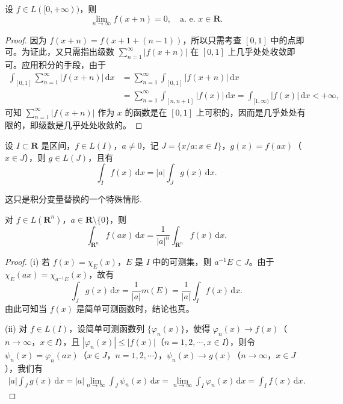 \documentclass[../../main.tex]{subfiles}
\begin{document}
\begin{example}
设 $f \in L([0, +\infty))$，则
\[
\lim_{n \to \infty} f(x + n) = 0, \quad \text{a. e. } x \in \mathbf{R}.
\]
\end{example}
\begin{proof}
因为 $f(x + n) = f(x + 1 + (n - 1))$，所以只需考查 $[0, 1]$ 中的点即可。为证此，又只需指出级数 $\sum_{n=1}^{\infty} |f(x + n)|$ 在 $[0, 1]$ 上几乎处处收敛即可。应用积分的手段，由于
\begin{align*}
\int_{[0, 1]} \sum_{n=1}^{\infty} |f(x + n)| \, \mathrm{d}x &= \sum_{n=1}^{\infty} \int_{[0, 1]} |f(x + n)| \, \mathrm{d}x \\
&= \sum_{n=1}^{\infty} \int_{[n, n + 1]} |f(x)| \, \mathrm{d}x = \int_{[1, \infty)} |f(x)| \, \mathrm{d}x < +\infty,
\end{align*}
可知 $\sum_{n=1}^{\infty} |f(x + n)|$ 作为 $x$ 的函数是在 $[0, 1]$ 上可积的，因而是几乎处处有限的，即级数是几乎处处收敛的。

\end{proof}

\begin{proposition}
设 $I \subset \mathbf{R}$ 是区间，$f \in L(I)$，$a \neq 0$，记 $J = \{ x / a : x \in I \}$，$g(x) = f(ax)$（$x \in J$），则 $g \in L(J)$，且有
\[
\int_I f(x) \, \mathrm{d}x = |a| \int_J g(x) \, \mathrm{d}x.
\]

\end{proposition}
\begin{remark}
这只是积分变量替换的一个特殊情形.
\end{remark}
\begin{note}
对 $f \in L(\mathbf{R}^n)$，$a \in \mathbf{R} \setminus \{ 0 \}$，则
\[
\int_{\mathbf{R}^n} f(ax) \, \mathrm{d}x = \frac{1}{|a|^n} \int_{\mathbf{R}^n} f(x) \, \mathrm{d}x.
\]
\end{note}
\begin{proof}
(i) 若 $f(x) = \chi_E(x)$，$E$ 是 $I$ 中的可测集，则 $a^{-1}E \subset J$。由于 $\chi_E(ax) = \chi_{a^{-1}E}(x)$，故有
\[
\int_J g(x) \, \mathrm{d}x = \frac{1}{|a|} m(E) = \frac{1}{|a|} \int_I f(x) \, \mathrm{d}x.
\]
由此可知当 $f(x)$ 是简单可测函数时，结论也真。

(ii) 对 $f \in L(I)$，设简单可测函数列 $\{ \varphi_n(x) \}$，使得 $\varphi_n(x) \to f(x)$（$n \to \infty$，$x \in I$），且 $|\varphi_n(x)| \leqslant |f(x)|$（$n = 1, 2, \cdots, x \in I$），则令 $\psi_n(x) = \varphi_n(ax)$（$x \in J$，$n = 1, 2, \cdots$），$\psi_n(x) \to g(x)$（$n \to \infty$，$x \in J$），我们有
\begin{align*}
|a| \int_J g(x) \, \mathrm{d}x = |a| \lim_{n \to \infty} \int_J \psi_n(x) \, \mathrm{d}x = \lim_{n \to \infty} \int_I \varphi_n(x) \, \mathrm{d}x = \int_I f(x) \, \mathrm{d}x.
\end{align*}

\end{proof}
\end{document}
